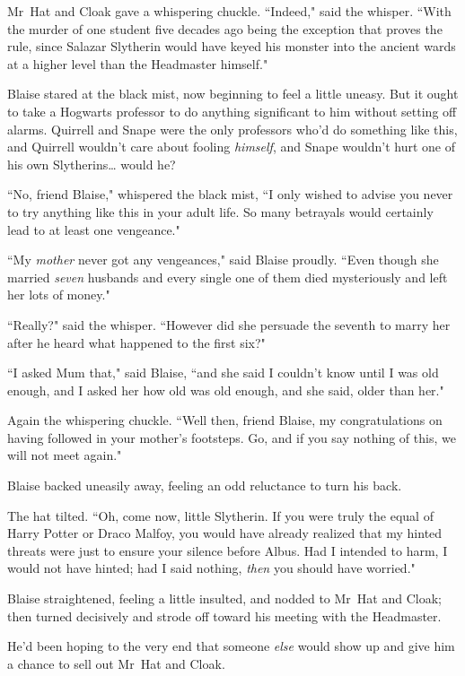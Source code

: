 Mr~Hat and Cloak gave a whispering chuckle. ``Indeed," said the whisper. ``With the murder of one student five decades ago being the exception that proves the rule, since Salazar Slytherin would have keyed his monster into the ancient wards at a higher level than the Headmaster himself."

Blaise stared at the black mist, now beginning to feel a little uneasy. But it ought to take a Hogwarts professor to do anything significant to him without setting off alarms. Quirrell and Snape were the only professors who'd do something like this, and Quirrell wouldn't care about fooling \emph{himself}, and Snape wouldn't hurt one of his own Slytherins{\ldots} would he?

``No, friend Blaise," whispered the black mist, ``I only wished to advise you never to try anything like this in your adult life. So many betrayals would certainly lead to at least one vengeance."

``My \emph{mother} never got any vengeances," said Blaise proudly. ``Even though she married \emph{seven} husbands and every single one of them died mysteriously and left her lots of money."

``Really?" said the whisper. ``However did she persuade the seventh to marry her after he heard what happened to the first six?"

``I asked Mum that," said Blaise, ``and she said I couldn't know until I was old enough, and I asked her how old was old enough, and she said, older than her."

Again the whispering chuckle. ``Well then, friend Blaise, my congratulations on having followed in your mother's footsteps. Go, and if you say nothing of this, we will not meet again."

Blaise backed uneasily away, feeling an odd reluctance to turn his back.

The hat tilted. ``Oh, come now, little Slytherin. If you were truly the equal of Harry Potter or Draco Malfoy, you would have already realized that my hinted threats were just to ensure your silence before Albus. Had I intended to harm, I would not have hinted; had I said nothing, \emph{then} you should have worried."

Blaise straightened, feeling a little insulted, and nodded to Mr~Hat and Cloak; then turned decisively and strode off toward his meeting with the Headmaster.

He'd been hoping to the very end that someone \emph{else} would show up and give him a chance to sell out Mr~Hat and Cloak.

